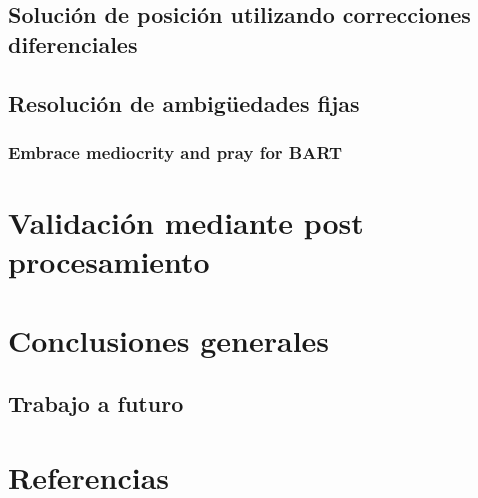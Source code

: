 \documentclass[a4paper,12pt,oneside,onecolumn,final,openright]{book}%
\begin{document}
\section{Solución de posición utilizando correcciones diferenciales}
\section{Resolución de ambigüedades fijas}
\subsection{Embrace mediocrity and pray for BART}
\chapter{Validación mediante post procesamiento}
\chapter*{Conclusiones generales}
\section*{Trabajo a futuro}
\chapter*{Referencias}
\end{document}

